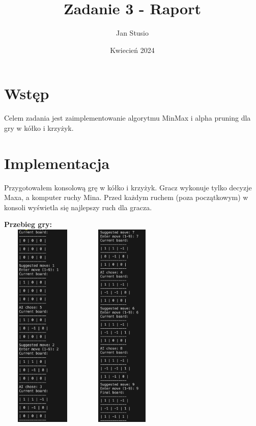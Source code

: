 \documentclass{article}
\title{Zadanie 3 - Raport}
\author{Jan Stusio}
\date{Kwiecień 2024}
\begin{document}
\maketitle

\section{Wstęp}

Celem zadania jest zaimplementowanie algorytmu MinMax i alpha pruning dla gry w kółko i krzyżyk.


\section{Implementacja}

Przygotowałem konsolową grę w kółko i krzyżyk. 
Gracz wykonuje tylko decyzje Maxa, a komputer ruchy Mina. 
Przed każdym ruchem (poza początkowym) w konsoli wyświetla się najlepszy ruch dla gracza.

\textbf{Przebieg gry:}\\

\includegraphics[width=4cm, height=10cm]{Screenshot 2024-04-15 at 21.58.35.png}
\includegraphics[width=4cm, height=10cm]{Screenshot 2024-04-15 at 21.58.19.png}
\end{document}
